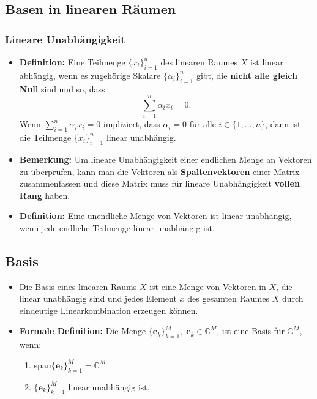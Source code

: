 \documentclass[11pt]{article}
\begin{document}

\vspace*{-0.5cm}
\subsection*{Basen in linearen Räumen}
\vspace*{-0.5cm}
\subsubsection*{Lineare Unabhängigkeit}
\vspace*{-0.5cm}
\begin{itemize}[leftmargin = 0pt]
    \item[] \textbf{Definition:} Eine Teilmenge $\{ x_i\}_{i=1}^n$ des linearen Raumes $X$ ist linear abhängig, wenn es zugehörige Skalare $\{\alpha_i\}_{i=1}^n$ gibt, die \textbf{nicht alle gleich Null} sind und so, dass $$\sum_{i=1}^n \alpha_i x_i = 0.$$ Wenn $\sum_{i=1}^n \alpha_i x_i = 0$ impliziert, dass $\alpha_i = 0$ für alle $i \in \{ 1, \dots, n\}$, dann ist die Teilmenge $\{ x_i\}_{i=1}^n$ linear unabhängig.
    \item[] \textbf{Bemerkung:} Um lineare Unabhängigkeit einer endlichen Menge an Vektoren zu überprüfen, kann man die Vektoren als \textbf{Spaltenvektoren} einer Matrix zusammenfassen und diese Matrix muss für lineare Unabhängigkeit \textbf{vollen Rang} haben.
    \item[] \textbf{Definition:} Eine unendliche Menge von Vektoren ist linear unabhängig, wenn jede endliche Teilmenge linear unabhängig ist.
\end{itemize}

\subsection*{Basis}
\vspace*{-0.5cm}
\begin{itemize}[leftmargin=0pt]
    \item[] Die Basis eines linearen Raums $X$ ist eine Menge von Vektoren in $X$, die linear unabhängig sind und jedes Element $x$ des gesamten Raumes $X$ durch eindeutige Linearkombination erzeugen können.
    \item[] \textbf{Formale Definition:} Die Menge $\{\mathbf{e}_k\}_{k=1}^M, \; \mathbf{e}_k \in \mathbb{C}^M$, ist eine Basis für $\mathbb{C}^M$, wenn:
    \begin{enumerate}
        \item $\text{span}\{\mathbf{e}_k\}_{k=1}^M = \mathbb{C}^M$
        \item $\{\mathbf{e}_k\}_{k=1}^M$ linear unabhängig ist.
    \end{enumerate}
\end{itemize}
\end{document}
